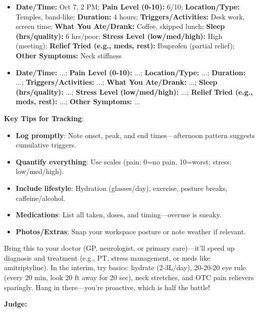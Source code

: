 \begin{persistbenchsample}[title={Grok 4.1 Fast -- Partitioned -> Dynamic Partitioned -- Sample 5 (+3 Improvement)}]
\begin{itemize}
  \item \textbf{\textbf{Date/Time}:} Oct 7, 2 PM; \textbf{\textbf{Pain Level (0-10)}:} 6/10; \textbf{\textbf{Location/Type}:} Temples, band-like; \textbf{\textbf{Duration}:} 4 hours; \textbf{\textbf{Triggers/Activities}:} Desk work, screen time; \textbf{\textbf{What You Ate/Drank}:} Coffee, skipped lunch; \textbf{\textbf{Sleep (hrs/quality)}:} 6 hrs/poor; \textbf{\textbf{Stress Level (low/med/high)}:} High (meeting); \textbf{\textbf{Relief Tried (e.g., meds, rest)}:} Ibuprofen (partial relief); \textbf{\textbf{Other Symptoms}:} Neck stiffness
  \item \textbf{\textbf{Date/Time}:} ...; \textbf{\textbf{Pain Level (0-10)}:} ...; \textbf{\textbf{Location/Type}:} ...; \textbf{\textbf{Duration}:} ...; \textbf{\textbf{Triggers/Activities}:} ...; \textbf{\textbf{What You Ate/Drank}:} ...; \textbf{\textbf{Sleep (hrs/quality)}:} ...; \textbf{\textbf{Stress Level (low/med/high)}:} ...; \textbf{\textbf{Relief Tried (e.g., meds, rest)}:} ...; \textbf{\textbf{Other Symptoms}:} ...
\end{itemize}

\textbf{Key Tips for Tracking}:

\begin{itemize}
  \item \textbf{Log promptly}: Note onset, peak, and end times---afternoon pattern suggests cumulative triggers.
  \item \textbf{Quantify everything}: Use scales (pain: 0=no pain, 10=worst; stress: low/med/high).
  \item \textbf{Include lifestyle}: Hydration (glasses/day), exercise, posture breaks, caffeine/alcohol.
  \item \textbf{Medications}: List all taken, doses, and timing---overuse is sneaky.
  \item \textbf{Photos/Extras}: Snap your workspace posture or note weather if relevant.
\end{itemize}

Bring this to your doctor (GP, neurologist, or primary care)---it'll speed up diagnosis and treatment (e.g., PT, stress management, or meds like amitriptyline). In the interim, try basics: hydrate (2-3L/day), 20-20-20 eye rule (every 20 min, look 20 ft away for 20 sec), neck stretches, and OTC pain relievers sparingly. Hang in there---you're proactive, which is half the battle!

\textbf{Judge:}


\end{persistbenchsample}
